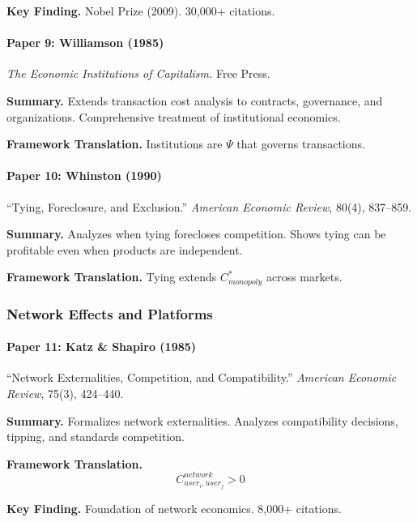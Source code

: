 \textbf{Key Finding.}
Nobel Prize (2009). 30,000+ citations.

\paragraph{Paper 9: Williamson (1985)}

\textit{The Economic Institutions of Capitalism.}
Free Press.

\textbf{Summary.}
Extends transaction cost analysis to contracts, governance, and organizations.
Comprehensive treatment of institutional economics.

\textbf{Framework Translation.}
Institutions are $\Psi$ that governs transactions.

\paragraph{Paper 10: Whinston (1990)}

``Tying, Foreclosure, and Exclusion.''
\textit{American Economic Review}, 80(4), 837--859.

\textbf{Summary.}
Analyzes when tying forecloses competition. Shows tying can be profitable 
even when products are independent.

\textbf{Framework Translation.}
Tying extends $C^*_{monopoly}$ across markets.

\subsubsection{Network Effects and Platforms}

\paragraph{Paper 11: Katz \& Shapiro (1985)}

``Network Externalities, Competition, and Compatibility.''
\textit{American Economic Review}, 75(3), 424--440.

\textbf{Summary.}
Formalizes network externalities. Analyzes compatibility decisions, 
tipping, and standards competition.

\textbf{Framework Translation.}
\begin{equation}
C_{user_i, user_j}^{network} > 0
\end{equation}

\textbf{Key Finding.}
Foundation of network economics. 8,000+ citations.

